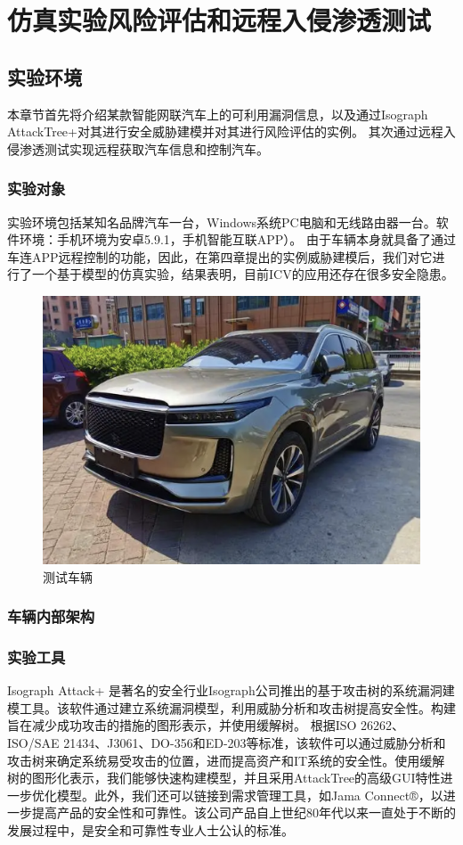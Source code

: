 \chapter{仿真实验风险评估和远程入侵渗透测试}
\label{ch5}
\section{实验环境}
本章节首先将介绍某款智能网联汽车上的可利用漏洞信息，以及通过Isograph AttackTree+对其进行安全威胁建模并对其进行风险评估的实例。
其次通过远程入侵渗透测试实现远程获取汽车信息和控制汽车。
\subsection{实验对象}
实验环境包括某知名品牌汽车一台，Windows系统PC电脑和无线路由器一台。软件环境：手机环境为安卓5.9.1，手机智能互联APP）。
由于车辆本身就具备了通过车连APP远程控制的功能，因此，在第四章提出的实例威胁建模后，我们对它进行了一个基于模型的仿真实验，结果表明，目前ICV的应用还存在很多安全隐患。

\begin{figure}
    \centering
    \includegraphics[scale=0.5]{resources/img/i14.png}
    \caption{测试车辆}
  \end{figure}
\subsection{车辆内部架构}
\subsection{实验工具}  

Isograph Attack+ 是著名的安全行业Isograph公司推出的基于攻击树的系统漏洞建模工具。该软件通过建立系统漏洞模型，利用威胁分析和攻击树提高安全性。构建旨在减少成功攻击的措施的图形表示，并使用缓解树。
根据ISO 26262、ISO/SAE 21434、J3061、DO-356和ED-203等标准，该软件可以通过威胁分析和攻击树来确定系统易受攻击的位置，进而提高资产和IT系统的安全性。使用缓解树的图形化表示，我们能够快速构建模型，并且采用AttackTree的高级GUI特性进一步优化模型。此外，我们还可以链接到需求管理工具，如Jama Connect®，以进一步提高产品的安全性和可靠性。该公司产品自上世纪80年代以来一直处于不断的发展过程中，是安全和可靠性专业人士公认的标准。

